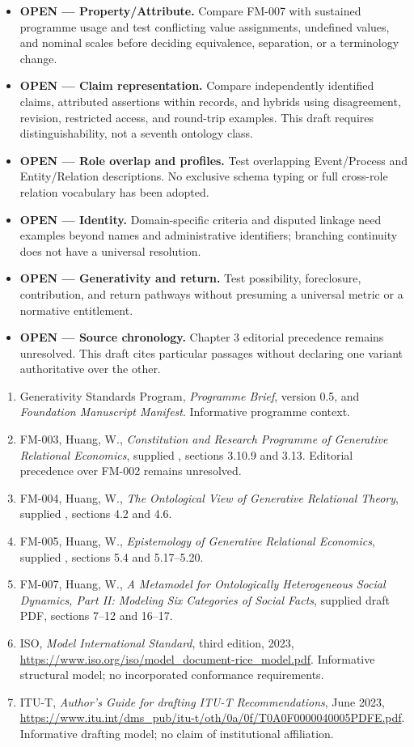 \documentclass[11pt,a4paper]{article}
\begin{document}
\begin{itemize}
\item \textbf{OPEN --- Property/Attribute.} Compare FM-007 with sustained programme usage and test conflicting value assignments, undefined values, and nominal scales before deciding equivalence, separation, or a terminology change.
\item \textbf{OPEN --- Claim representation.} Compare independently identified claims, attributed assertions within records, and hybrids using disagreement, revision, restricted access, and round-trip examples. This draft requires distinguishability, not a seventh ontology class.
\item \textbf{OPEN --- Role overlap and profiles.} Test overlapping Event/Process and Entity/Relation descriptions. No exclusive schema typing or full cross-role relation vocabulary has been adopted.
\item \textbf{OPEN --- Identity.} Domain-specific criteria and disputed linkage need examples beyond names and administrative identifiers; branching continuity does not have a universal resolution.
\item \textbf{OPEN --- Generativity and return.} Test possibility, foreclosure, contribution, and return pathways without presuming a universal metric or a normative entitlement.
\item \textbf{OPEN --- Source chronology.} Chapter 3 editorial precedence remains unresolved. This draft cites particular passages without declaring one variant authoritative over the other.
\end{itemize}


\GSPbibliography
\begin{enumerate}
\item Generativity Standards Program, \emph{Programme Brief}, version 0.5, and \emph{Foundation Manuscript Manifest}. Informative programme context.
\item FM-003, Huang, W., \emph{Constitution and Research Programme of Generative Relational Economics}, supplied , sections 3.10.9 and 3.13. Editorial precedence over FM-002 remains unresolved.
\item FM-004, Huang, W., \emph{The Ontological View of Generative Relational Theory}, supplied , sections 4.2 and 4.6.
\item FM-005, Huang, W., \emph{Epistemology of Generative Relational Economics}, supplied , sections 5.4 and 5.17--5.20.
\item FM-007, Huang, W., \emph{A Metamodel for Ontologically Heterogeneous Social Dynamics, Part II: Modeling Six Categories of Social Facts}, supplied draft PDF, sections 7--12 and 16--17.
\item ISO, \emph{Model International Standard}, third edition, 2023, \url{https://www.iso.org/iso/model_document-rice_model.pdf}. Informative structural model; no incorporated conformance requirements.
\item ITU-T, \emph{Author's Guide for drafting ITU-T Recommendations}, June 2023, \url{https://www.itu.int/dms_pub/itu-t/oth/0a/0f/T0A0F0000040005PDFE.pdf}. Informative drafting model; no claim of institutional affiliation.
\end{enumerate}
\end{document}
